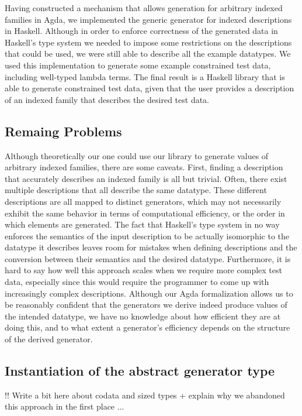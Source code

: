 \documentclass[a4paper,msc,twosized=semi]{uustthesis}
\begin{document}
  Having constructed a mechanism that allows generation for arbitrary indexed families in Agda, we implemented the generic generator for indexed descriptions in Haskell. Although in order to enforce correctness of the generated data in Haskell's type system we needed to impose some restrictions on the descriptions that could be used, we were still able to describe all the example datatypes. We used this implementation to generate some example constrained test data, including well-typed lambda terms. The final result is a Haskell library that is able to generate constrained test data, given that the user provides a description of an indexed family that describes the desired test data. 
  
\subsection{Remaing Problems}

  Although theoretically our one could use our library to generate values of arbitrary indexed families, there are some caveats. First, finding a description that accurately describes an indexed family is all but trivial. Often, there exist multiple descriptions that all describe the same datatype. These different descriptions are all mapped to distinct generators, which may not necessarily exhibit the same behavior in terms of computational efficiency, or the order in which elements are generated. The fact that Haskell's type system in no way enforces the semantics of the input description to be actually isomorphic to the datatype it describes leaves room for mistakes when defining descriptions and the conversion between their semantics and the desired datatype. Furthermore, it is hard to say how well this approach scales when we require more complex test data, especially since this would require the programmer to come up with increasingly complex descriptions. Although our Agda formalization allows us to be reasonably confident that the generators we derive indeed produce values of the intended datatype, we have no knowledge about how efficient they are at doing this, and to what extent a generator's efficiency depends on the structure of the derived generator. 

\subsection{Instantiation of the abstract generator type}

  !! Write a bit here about codata and sized types + explain why we abandoned this approach in the first place ... 
\end{document}
